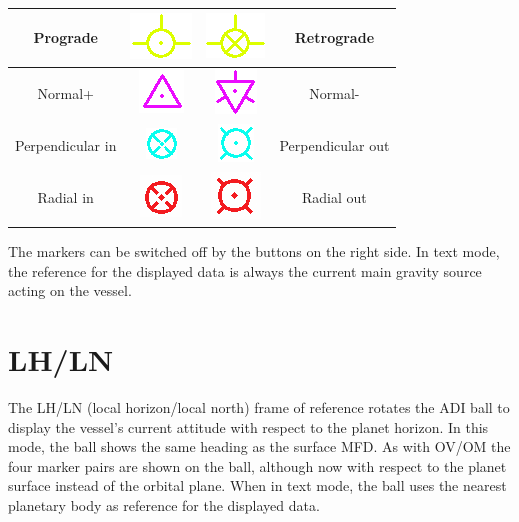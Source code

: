 \documentclass[paper=a4, 11 pt]{report}
\begin{document}
\renewcommand{\arraystretch}{2.5}
\begin{center}
\begin{tabular}{ |c  c | c  c| }
  \hline
  Prograde & \includegraphics[scale=.5]{pgd.png} & \includegraphics[scale=.5]{pgd_2.png} & Retrograde \\ \hline
  Normal+ & \includegraphics[scale=.5]{nml.png} & \includegraphics[scale=.5]{nml_2.png} & Normal- \\ \hline
  Perpendicular in & \includegraphics[scale=.5]{perp_in.png} & \includegraphics[scale=.5]{perp_out.png} & Perpendicular out \\ \hline
  Radial in & \includegraphics[scale=.5]{rad_in.png} & \includegraphics[scale=.5]{rad_out.png} & Radial out \\ \hline
\end{tabular}
\end{center}

The markers can be switched off by the buttons on the right side.
In text mode, the reference for the displayed data is always the current main gravity source acting on the vessel.

\section{LH/LN}
The LH/LN (local horizon/local north) frame of reference rotates the ADI ball to display the vessel's current attitude with respect to the planet horizon.
In this mode, the ball shows the same heading as the surface MFD.
As with OV/OM the four marker pairs are shown on the ball, although now with respect to the planet surface instead of the orbital plane.
When in text mode, the ball uses the nearest planetary body as reference for the displayed data.
\end{document}
